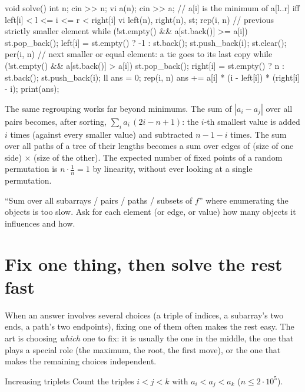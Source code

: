 \begin{code}
void solve() {
    int n;
    cin >> n;
    vi a(n);
    cin >> a;
    // a[i] is the minimum of a[l..r] iff left[i] < l <= i <= r < right[i]
    vi left(n), right(n), st;
    rep(i, n) {  // previous strictly smaller element
        while (!st.empty() && a[st.back()] >= a[i]) st.pop_back();
        left[i] = st.empty() ? -1 : st.back();
        st.push_back(i);
    }
    st.clear();
    per(i, n) {  // next smaller or equal element: a tie goes to its last copy
        while (!st.empty() && a[st.back()] > a[i]) st.pop_back();
        right[i] = st.empty() ? n : st.back();
        st.push_back(i);
    }
    ll ans = 0;
    rep(i, n) ans += a[i] * (i - left[i]) * (right[i] - i);
    print(ans);
}
\end{code}

The same regrouping works far beyond minimums. The sum of $|a_i - a_j|$ over all pairs becomes, after sorting, $\sum_i
a_i\,(2i - n + 1)$: the $i$-th smallest value is added $i$ times (against every smaller value) and subtracted $n - 1 - i$
times. The sum over all paths of a tree of their lengths becomes a sum over edges of (size of one side) $\times$ (size of the
other). The expected number of fixed points of a random permutation is $n \cdot \frac1n = 1$ by linearity, without ever
looking at a single permutation.

\begin{recognize}
``Sum over all subarrays / pairs / paths / subsets of $f$'' where enumerating the objects is too slow. Ask for each element
(or edge, or value) how many objects it influences and how.
\end{recognize}

\section[Fix one thing]{Fix one thing, then solve the rest fast \hfill \silver}\label{sec:fixone}

When an answer involves several choices (a triple of indices, a subarray's two ends, a path's two endpoints), fixing one of
them often makes the rest easy. The art is choosing \emph{which} one to fix: it is usually the one in the middle, the one
that plays a special role (the maximum, the root, the first move), or the one that makes the remaining choices independent.

\begin{problem}{Increasing triplets}
Count the triples $i < j < k$ with $a_i < a_j < a_k$ ($n \le 2 \cdot 10^5$).
\end{problem}

